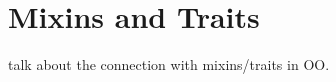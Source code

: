 

\section{Mixins and Traits}
\label{sec:bg:mixin:trait}

talk about the connection with mixins/traits in OO.



